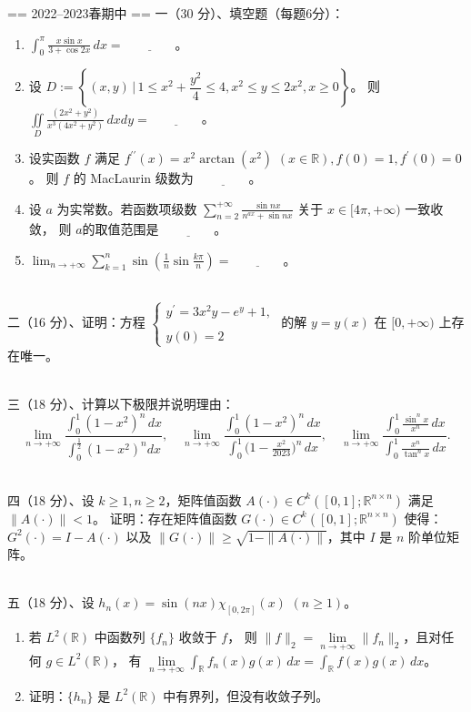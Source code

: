 == 2022--2023春期中 ==
一（30 分）、填空题（每题6分）：
\begin{enumerate}[label=(\arabic*)]
\item $\displaystyle\int_{0}^{\pi} \frac{x \sin x}{3+\cos 2x} \, dx=\underline{\qquad\qquad}$。
\item 设 $D:=\left\{(x, y) \,\bigg|\, 1 \leq x^{2}+\dfrac{y^{2}}{4} \leq 4, x^{2} \leq y \leq 2 x^{2}, x \geq 0\right\}$。
则 $\displaystyle\iint\limits_{D} \frac{(2x^{2}+y^{2})}{x^{3}(4x^{2}+y^{2})} \, dx dy=\underline{\qquad\qquad}$。
\item 设实函数 $f$ 满足 $f^{\prime \prime}(x)=x^{2} \arctan (x^{2})$ $(x \in \mathbb{R}), f(0)=1, f^{\prime}(0)=0$。
则 $f$ 的 MacLaurin 级数为 $\underline{\qquad\qquad}$。
\item 设 $a$ 为实常数。若函数项级数 $\displaystyle\sum_{n=2}^{+\infty} \frac{\sin nx}{n^{ax}+\sin nx}$ 关于 $x \in[4\pi,+\infty)$ 一致收敛，
则 $a$的取值范围是 $\underline{\qquad\qquad}$。
\item $\displaystyle\lim_{n \rightarrow+\infty} \sum_{k=1}^{n} \sin \left(\frac{1}{n} \sin \frac{k\pi}{n}\right)=\underline{\qquad\qquad}$。
\end{enumerate}
~\\
二（16 分）、证明：方程 $\begin{cases}y^{\prime}=3x^{2} y-e^{y}+1, \\ \\ y(0)=2\end{cases}$ 的解 $y=y(x)$ 在 $[0,+\infty)$ 上存在唯一。

~\\
三（18 分）、计算以下极限并说明理由：
\[\lim_{n \rightarrow+\infty}\frac{\int_{0}^{1}(1-x^{2})^{n}\,dx}{\int_{0}^{\frac{1}{2}}\left(1-x^{2}\right)^{n} dx}, \quad 
\lim_{n \rightarrow+\infty}\frac{\int_{0}^{1}(1-x^{2})^{n}\,dx}{\int_{0}^{1}\big(1-\frac{x^{2}}{2023}\big)^{n}\,dx}, \quad 
\lim_{n \rightarrow+\infty}\frac{\int_{0}^{1}\frac{\sin^{n} x}{x^{n}}\,dx}{\int_{0}^{1}\frac{x^{n}}{\tan^{n}x}\,dx}.\]

~\\
四（18 分）、设 $k \geq 1, n \geq 2$，矩阵值函数 $A(\cdot) \in C^{k}([0,1] ; \mathbb{R}^{n \times n})$ 满足 $\|A(\cdot)\|<1$。
证明：存在矩阵值函数 $G(\cdot) \in C^{k}([0,1];\mathbb{R}^{n \times n})$ 使得：$G^{2}(\cdot)=I-A(\cdot)$ 以及 $\|G(\cdot)\| \geq \sqrt{1-\|A(\cdot)\|}$，其中 $I$ 是 $n$ 阶单位矩阵。

~\\
五（18 分）、设 $h_{n}(x)=\sin (nx) \chi_{[0,2\pi]}(x)$ $(n \geq 1)$。
\begin{enumerate}[label=(\arabic*)]
\item 若 $L^{2}(\mathbb{R})$ 中函数列 $\{f_{n}\}$ 收敛于 $f$，
则 $\|f\|_{2}=\lim\limits_{n \rightarrow+\infty}\|f_{n}\|_{2}$，且对任何 $g \in L^{2}(\mathbb{R})$，
有 $\lim\limits_{n \rightarrow+\infty} \int_{\mathbb{R}} f_{n}(x) g(x) \, dx=\int_{\mathbb{R}} f(x) g(x) \, dx$。
\item 证明：$\{h_{n}\}$ 是 $L^{2}(\mathbb{R})$ 中有界列，但没有收敛子列。
\end{enumerate}

